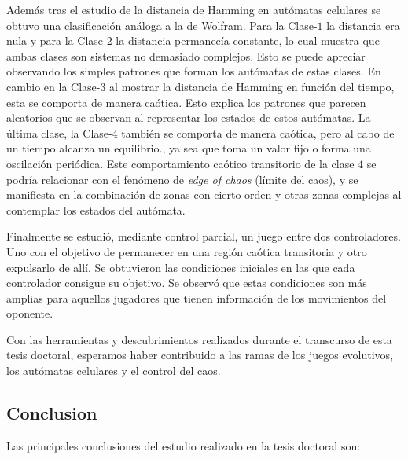 Además tras el estudio de la distancia de Hamming en autómatas celulares se obtuvo una clasificación análoga a la de Wolfram. Para la Clase-$1$ la distancia era nula y para la Clase-$2$ la distancia permanecía constante, lo cual muestra que ambas clases son sistemas no demasiado complejos. Esto se puede apreciar observando los simples patrones que forman los autómatas de estas clases. En cambio en la Clase-$3$ al mostrar la distancia de Hamming en función del tiempo, esta se comporta de manera caótica. Esto explica los patrones que parecen aleatorios que se observan al representar los estados de estos autómatas. La última clase, la Clase-$4$ también se comporta de manera caótica, pero al cabo de un tiempo alcanza un equilibrio., ya sea que toma un valor fijo o forma una oscilación periódica. Este comportamiento caótico transitorio de la clase $4$ se podría relacionar con el fenómeno de \textit{edge of chaos} (límite del caos), y se manifiesta en la combinación de zonas con cierto orden y otras zonas complejas al contemplar los estados del autómata.

Finalmente se estudió, mediante control parcial, un juego entre dos controladores. Uno con el objetivo de permanecer en una región caótica transitoria y otro expulsarlo de allí. Se obtuvieron las condiciones iniciales en las que cada controlador consigue su objetivo. Se observó que estas condiciones son más amplias para aquellos jugadores que tienen información de los movimientos del oponente.

Con las herramientas y descubrimientos realizados durante el transcurso de esta tesis doctoral, esperamos haber contribuido a las ramas de los juegos evolutivos, los autómatas celulares y el control del caos.

\subsection{Conclusion}

Las principales conclusiones del estudio realizado en la tesis doctoral son:

